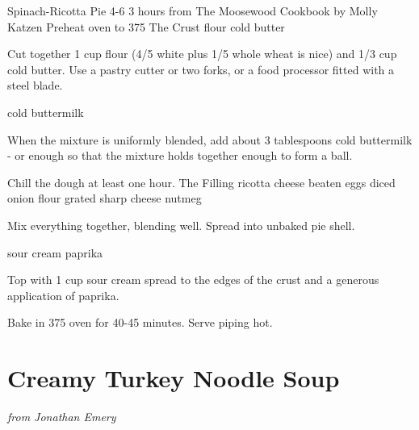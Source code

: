 \documentclass[openany]{book}
\begin{document}
\begin {recipe} {Spinach-Ricotta Pie} {4-6} {3 hours}
\freeform from The Moosewood Cookbook by Molly Katzen
\freeform Preheat oven to 375
\freeform The Crust
 {flour}
 {cold butter}

Cut together 1 cup flour (4/5 white plus 1/5 whole wheat is nice) and 1/3 cup cold butter. Use a pastry cutter or two forks, or a food processor fitted with a steel blade.

 {cold buttermilk}

When the mixture is uniformly blended, add about 3 tablespoons cold buttermilk - or enough so that the mixture holds together enough to form a ball.
\newstep

Chill the dough at least one hour.
\freeform The Filling
 {ricotta cheese}
\ingredient [3] {} {beaten eggs}
 {diced onion}
 {flour}
 {grated sharp cheese}
 {nutmeg}

Mix everything together, blending well. Spread into unbaked pie shell.

 {sour cream}
\ingredient [] {} {paprika}

Top with 1 cup sour cream spread to the edges of the crust and a generous application of paprika.
\newstep

Bake in 375 oven for 40-45 minutes. Serve piping hot.

\end {recipe}

\chapter{Creamy Turkey Noodle Soup}\label{creamy-turkey-noodle-soup}

\emph{from Jonathan Emery}
\end{document}
